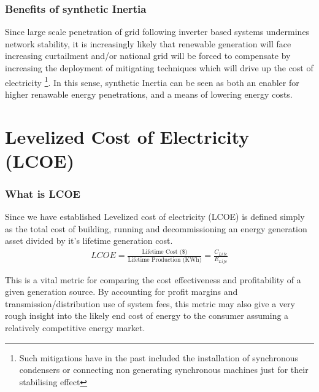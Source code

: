 \documentclass[11pt]{article}
\numberwithin{equation}{section}
\begin{document}
\subsubsection{Benefits of synthetic Inertia}
\label{sec:org151ac69}
Since large scale penetration of grid following inverter based systems undermines network stability, it is increasingly likely that renewable generation will face increasing curtailment and/or national grid will be forced to compensate by increasing the deployment of mitigating techniques which will drive up the cost of electricity \footnote{Such mitigations have in the past included the installation of synchronous condensers or connecting non generating synchronous machines just for their stabilising effect}. In this sense, synthetic Inertia can be seen as both an enabler for higher renawable energy penetrations, and a means of lowering energy costs.

\section{Levelized Cost of Electricity (LCOE)}
\label{sec:orga945d80}
\subsubsection{What is LCOE}
\label{sec:org84baed2}
Since we have established
Levelized cost of electricity (LCOE) is defined simply as the total cost of building, running and decommissioning an energy generation asset divided by it's lifetime generation cost.
\begin{align}
\label{eqLCOE}
LCOE = \frac{\text{Lifetime Cost (\$)}}{\text{Lifetime Production (KWh)}} = \frac{C_{Life}}{E_{Life}}
\end{align}

This is a vital metric for comparing the cost effectiveness and profitability of a given generation source. By accounting for profit margins and transmission/distribution use of system fees, this metric may also give a very rough insight into the likely end cost of energy to the consumer assuming a relatively competitive energy market.
\end{document}
